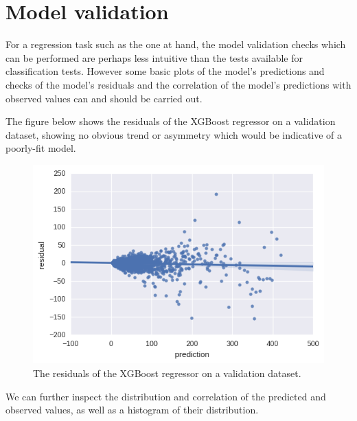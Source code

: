 \documentclass[11pt]{article}
\begin{document}
\section{Model validation}\label{model-validation}

For a regression task such as the one at hand, the model validation
checks which can be performed are perhaps less intuitive than the tests
available for classification tests. However some basic plots of the
model's predictions and checks of the model's residuals and the
correlation of the model's predictions with observed values can and
should be carried out.

The figure below shows the residuals of the XGBoost regressor on a
validation dataset, showing no obvious trend or asymmetry which would be
indicative of a poorly-fit model.

\begin{figure}

{\centering \includegraphics[width=0.49\linewidth]{../figures/xgb_residuals} 

}

\caption{The residuals of the XGBoost regressor on a validation dataset.}\label{fig:unnamed-chunk-3}
\end{figure}

We can further inspect the distribution and correlation of the predicted
and observed values, as well as a histogram of their distribution.
\end{document}

